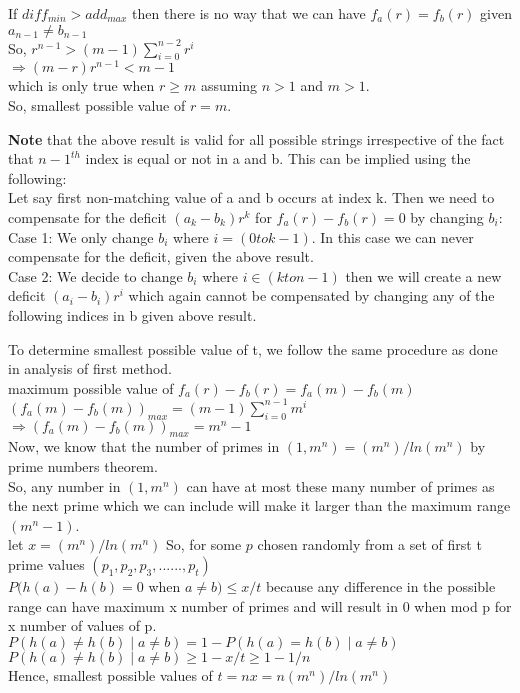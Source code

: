 \documentclass[11pt]{article}
\begin{document}
	If $diff_{min} > add_{max}$ then there is no way that we can have $f_a(r) = f_b(r)$ given $a_{n-1} \neq b_{n-1}$ \\
	So, $r^{n-1} > (m-1) \sum_{i=0}^{n-2}r^i$ \\
	$\Rightarrow (m-r)r^{n-1} < m-1$ \\
	which is only true when $r \geq m$ assuming $n > 1$ and $m > 1$.\\
	So, smallest possible value of $r = m$.
	
	\textbf{Note} that the above result is valid for all possible strings irrespective of the fact that ${n-1}^{th}$ index is equal or not 
	in a and b. This can be implied using the following: \\
	Let say first non-matching value of a and b  occurs at index k. Then we need to compensate for the deficit  $(a_k - b_k) r^k$ for 
	$f_a(r) - f_b(r) = 0$ by changing $b_i$: \\
	Case 1: We only change $b_i$ where $i = (0 to k-1)$. In this case we  can never compensate for the deficit, given the above result.\\
	Case 2: We decide to change $b_i$ where $ i \in (k to n-1)$ then we will create a new deficit $(a_i-b_i)r^i$ which again cannot be 
	compensated by changing any of the following indices in b given above result.
	
	To determine smallest possible value of t, we follow the same procedure as done in analysis of first method.\\
	maximum possible value of $f_a(r) - f_b(r) = f_a(m) - f_b(m)$ \\
	$(f_a(m) - f_b(m))_{max} = (m-1) \sum_{i=0}^{n-1} m^i$ \\
	$ \Rightarrow  (f_a(m) - f_b(m))_{max} = m^n-1$ \\
	Now, we know that the number of primes in $(1, m^n) = (m^n)/ln(m^n)$ by prime numbers theorem.\\
	So, any number in $(1, m^n)$ can have at most these many  number of primes as the next prime which we can include will make
	it larger than the maximum range $(m^n-1)$.\\
	let $x =  (m^n)/ln(m^n)$
	So, for some $p$ chosen randomly from a set of first t prime values $(p_1,p_2,p_3,......,p_t)$ \\
	$P(h(a) - h(b) = 0$ when $a \neq b) \leq x/t$ because any difference in the possible range can have maximum x number of primes
	and will result in 0 when mod p for x number of values of p.\\
	$P(h(a) \neq h(b) \mid a \neq b) = 1 - P(h(a) = h(b) \mid a \neq b)$ \\
	$P(h(a) \neq h(b) \mid a \neq b) \geq 1- x/t  \geq 1 - 1/n$ \\
	Hence, smallest possible values of $t = nx = n(m^n)/ln(m^n)$ \\
	
\end{document}
